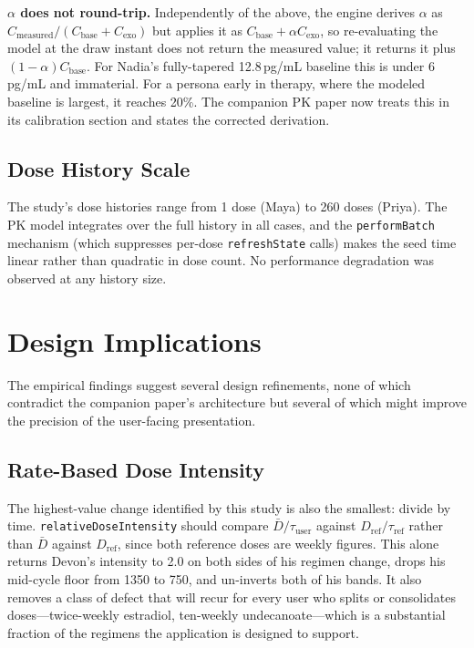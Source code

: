 \documentclass[11pt,a4paper]{article}
\newcommand{\code}[1]{\texttt{\small #1}}
\begin{document}
\textbf{$\alpha$ does not round-trip.} Independently of the above, the
engine derives $\alpha$ as
$C_{\text{measured}} / (C_{\text{base}} + C_{\text{exo}})$ but applies it as
$C_{\text{base}} + \alpha C_{\text{exo}}$, so re-evaluating the model at the
draw instant does not return the measured value; it returns it plus
$(1-\alpha) C_{\text{base}}$. For Nadia's fully-tapered 12.8\,pg/mL baseline
this is under 6\,pg/mL and immaterial. For a persona early in therapy, where
the modeled baseline is largest, it reaches 20\%. The companion PK paper now
treats this in its calibration section and states the corrected derivation.

\subsection{Dose History Scale}

The study's dose histories range from 1 dose (Maya) to 260 doses (Priya).
The PK model integrates over the full history in all cases, and the
\code{performBatch} mechanism (which suppresses per-dose \code{refreshState}
calls) makes the seed time linear rather than quadratic in dose count. No
performance degradation was observed at any history size.

\section{Design Implications}
\label{sec:implications}

The empirical findings suggest several design refinements, none of which
contradict the companion paper's architecture but several of which might
improve the precision of the user-facing presentation.

\subsection{Rate-Based Dose Intensity}
\label{sec:impl_intensity}

The highest-value change identified by this study is also the smallest:
divide by time. \code{relativeDoseIntensity} should compare
$\bar{D}/\tau_{\text{user}}$ against $D_{\text{ref}}/\tau_{\text{ref}}$
rather than $\bar{D}$ against $D_{\text{ref}}$, since both reference doses
are weekly figures. This alone returns Devon's intensity to 2.0 on both
sides of his regimen change, drops his mid-cycle floor from 1350 to 750,
and un-inverts both of his bands. It also removes a class of defect that
will recur for every user who splits or consolidates doses---twice-weekly
estradiol, ten-weekly undecanoate---which is a substantial fraction of the
regimens the application is designed to support.
\end{document}
